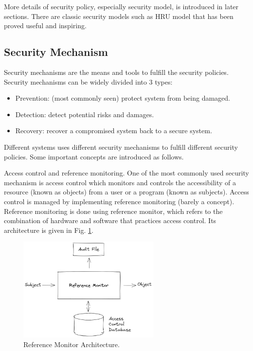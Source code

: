 More details of security policy, especially security model, is introduced in later sections. There are classic security models such as HRU model that has been proved useful and inspiring.

\subsection{Security Mechanism}

Security mechanisms are the means and tools to fulfill the security policies. Security mechanisms can be widely divided into 3 types:
\begin{itemize}
  \item Prevention: (most commonly seen) protect system from being damaged.
  \item Detection: detect potential risks and damages.
  \item Recovery: recover a compromised system back to a secure system.
\end{itemize}

Different systems uses different security mechanisms to fulfill different security policies. Some important concepts are introduced as follows.

Access control and reference monitoring. One of the most commonly used security mechanism is access control which monitors and controls the accessibility of a resource (known as objects) from a user or a program (known as subjects). Access control is managed by implementing reference monitoring (barely a concept). Reference monitoring is done using reference monitor, which refers to the combination of hardware and software that practices access control. Its architecture is given in Fig. \ref{ch:ossec:fig:reference_monitor}.

\begin{figure}[htbp]
	\centering
	\includegraphics[width=200pt]{chapters/ch-computer-security-basics/figures/reference_monitor.png}
	\caption{Reference Monitor Architecture.} \label{ch:ossec:fig:reference_monitor}
\end{figure}

